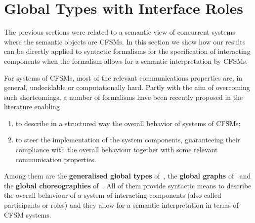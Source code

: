 
\section{Global Types with Interface Roles}
\label{sec:gtir}

The previous sections were related to a semantic view of concurrent systems where the
semantic objects are CFSMs.
In this section we show how our results
can be directly applied to syntactic formalisms for the specification of interacting components
when the formalism allows for a semantic interpretation by CFSMs.


For systems of CFSMs, most of the relevant communications properties are, in general, undecidable
\cite{CF05} or computationally hard. 
Partly with the aim of overcoming such shortcomings, 
a number of formalisms have been recently proposed in the literature 
enabling
\begin{enumerate}[(1)]
\item
 to describe in a structured way the overall behavior of systems of CFSMs;
\item
 to steer the implementation of the system components, guaranteeing their compliance with the overall behaviour together with some relevant communication properties.
 \end{enumerate}

Among them are
the {\bf generalised global types} of~\cite{DY12}, the {\bf global graphs} of~\cite{TY15}
and the {\bf global choreographies} of~\cite{TG18}.
All of them provide syntactic means to describe the overall behaviour of a system
of interacting components (also called participants or roles) 
and they allow for a semantic interpretation in terms of CFSM systems. 

